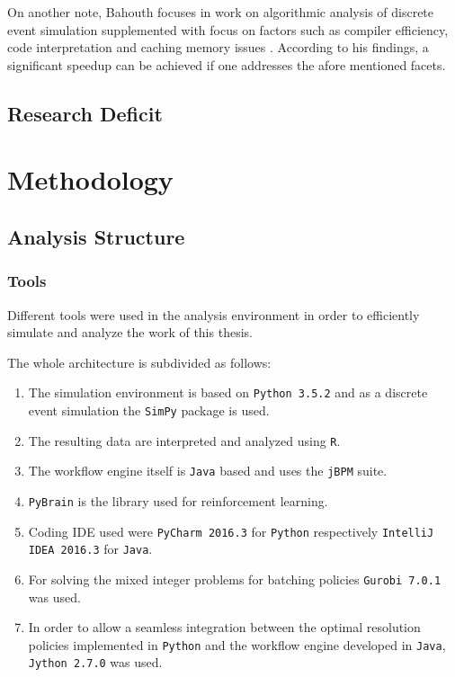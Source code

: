 \documentclass{seal_thesis}
\begin{document}
On another note, Bahouth focuses in work on algorithmic analysis of discrete event simulation supplemented with focus on factors such as compiler efficiency, code interpretation and caching memory issues \cite{Bahouth2007}. According to his findings, a significant speedup can be achieved if one addresses the afore mentioned facets.

\section{Research Deficit}

\chapter{Methodology}
\label{ch:methodology}

\section{Analysis Structure}
\subsection{Tools}
Different tools were used in the analysis environment in order to efficiently simulate and analyze the work of this thesis.

The whole architecture is subdivided as follows:
\begin{enumerate}
	\item The simulation environment is based on \texttt{Python 3.5.2} and as a discrete event simulation the \texttt{SimPy} package is used.
	\item The resulting data are interpreted and analyzed using \texttt{R}.
	\item The workflow engine itself is \texttt{Java} based and uses the \texttt{jBPM} suite.
	\item \texttt{PyBrain} is the library used for reinforcement learning.
	\item Coding IDE used were \texttt{PyCharm 2016.3} for \texttt{Python} respectively \texttt{IntelliJ IDEA 2016.3} for \texttt{Java}.
	\item For solving the mixed integer problems for batching policies \texttt{Gurobi 7.0.1} was used.
	\item In order to allow a seamless integration between the optimal resolution policies implemented in \texttt{Python} and the workflow engine developed in \texttt{Java}, \texttt{Jython 2.7.0} was used.
\end{enumerate}
\end{document}

